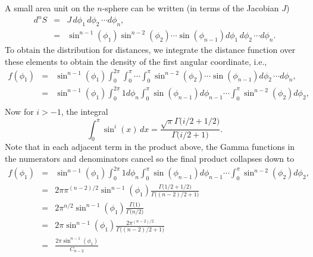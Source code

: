 A small area unit on the $n$-sphere can be written (in terms of the
Jacobian $J$)
\begin{eqnarray}
  \label{eq:vn_n_sphere}
  d^nS & = & J \, d\phi_1 \, d\phi_2 \, \cdots d\phi_{n},  \nonumber \\
       & = & \sin^{n-1}(\phi_1) \sin^{n-2}(\phi_2) \cdots \sin(\phi_{n-1})
                  d\phi_1 \, d\phi_2 \, \cdots d\phi_{n}.
\end{eqnarray}
To obtain the distribution for distances, we integrate the distance
function over these elements to obtain the density of the first
angular coordinate, i.e.,
\begin{eqnarray}
  f(\phi_1)
      & = & \sin^{n-1}(\phi_1)
              \int_{0}^{2\pi} \int_{0}^{\pi} \cdots  \int_{0}^{\pi} 
              \sin^{n-2}(\phi_2) \cdots \sin(\phi_{n-1})
                   d\phi_2 \, \cdots d\phi_{n}, \nonumber \\
      & = & \sin^{n-1}(\phi_1)
              \int_{0}^{2\pi} 1 d\phi_{n} 
              \int_{0}^{\pi} \sin(\phi_{n-1}) d\phi_{n-1}  
              \cdots  
              \int_{0}^{\pi} \sin^{n-2}(\phi_2)  d\phi_{2}, \nonumber \\   
\end{eqnarray}
Now for $i>-1$, the integral %
\begin{equation}
  \label{eq:int_sin_n}
  \int_0^{\pi} \sin^i(x) \, dx = 
       \frac{\sqrt{\pi} \Gamma\big( i/2 + 1/2 \big)}{\Gamma\big( i/2+1 \big)}.
\end{equation}
Note that in each adjacent term in the product above, the Gamma
functions in the numerators and denominators cancel so the final
product collapses down to
\begin{eqnarray}
  f(\phi_1)
      & = & \sin^{n-1}(\phi_1)
              \int_{0}^{2\pi} 1 d\phi_{n} 
              \int_{0}^{\pi} \sin(\phi_{n-1}) d\phi_{n-1}  
              \cdots  
              \int_{0}^{\pi} \sin^{n-2}(\phi_2)  d\phi_{2}, \nonumber \\   
      & = & 2 \pi \pi^{(n-2)/2} \sin^{n-1}(\phi_1)  
                     \frac{\Gamma\big( 1/2 + 1/2 \big)}{\Gamma\big( (n-2)/2+1 \big)}
                 \nonumber \\   
      & = & 2 \pi^{n/2} \sin^{n-1}(\phi_1)  
                     \frac{\Gamma\big(1 \big)}{\Gamma\big( n/2 \big)}
                 \nonumber \\   
      & = &  2 \pi \sin^{n-1}(\phi_1)  
                     \frac{2 \pi^{(n-2)/2}}{\Gamma\big( (n-2)/2+1 \big)}
                 \nonumber \\   
      & = &   \frac{2 \pi \sin^{n-1}(\phi_1)}{C_{n-2}}
                 \nonumber \\   
\end{eqnarray}

